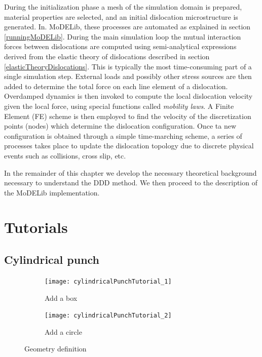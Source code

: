  During the initialization phase a mesh of the simulation domain is prepared, material properties are selected, and an initial dislocation microstructure is generated. In. MoDELib, these processes are automated as explained in section \ref{runningMoDELib}. During the main simulation loop the mutual interaction forces between dislocations are computed using semi-analytical expressions derived from the elastic theory of dislocations described in section \ref{elasticTheoryDislocations}. This is typically the most time-consuming part of a single simulation step. External loads and possibly other stress sources are then added to determine the total force on each line element of a dislocation. Overdamped dynamics is then invoked to compute the local dislocation velocity given the local force, using special functions called \textit{mobility laws}. A Finite Element (FE) scheme is then employed to find the velocity of the discretization points (nodes) which determine the dislocation configuration. Once ta new configuration is obtained through a simple time-marching scheme, a series of processes takes place to update the dislocation topology due to discrete physical events such as collisions, cross slip, etc.

In the remainder of this chapter we develop the necessary theoretical background necessary to understand the  DDD method. We then proceed to the description of the MoDELib implementation. 

\section{Tutorials}

\subsection{Cylindrical punch}

\begin{figure}[h]
 \centering
  \begin{subfigure}{\textwidth}
 \texttt{[image: cylindricalPunchTutorial\_1]}
 \caption{Add a box}
  \label{cylindricalPunchTutorial1}
\end{subfigure}
  \begin{subfigure}{\textwidth}
 \texttt{[image: cylindricalPunchTutorial\_2]}
 \caption{Add a circle}
  \label{cylindricalPunchTutorial2}
\end{subfigure}
   \caption{Geometry definition }
    \label{DDDnutshell}
 \end{figure}
 
